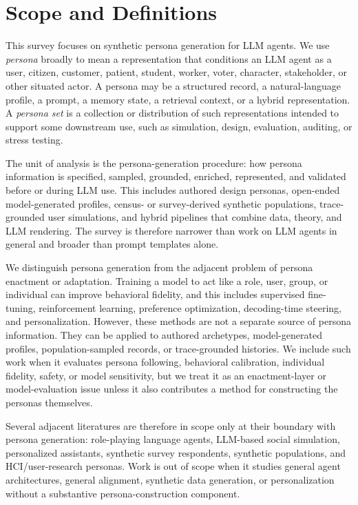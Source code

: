 \section{Scope and Definitions}
This survey focuses on synthetic persona generation for LLM agents. We use
\emph{persona} broadly to mean a representation that conditions an LLM agent as
a user, citizen, customer, patient, student, worker, voter, character,
stakeholder, or other situated actor. A persona may be a structured record, a
natural-language profile, a prompt, a memory state, a retrieval context, or a
hybrid representation. A \emph{persona set} is a collection or distribution of
such representations intended to support some downstream use, such as
simulation, design, evaluation, auditing, or stress testing.

The unit of analysis is the persona-generation procedure: how persona
information is specified, sampled, grounded, enriched, represented, and
validated before or during LLM use. This includes authored design personas,
open-ended model-generated profiles, census- or survey-derived synthetic
populations, trace-grounded user simulations, and hybrid pipelines that combine
data, theory, and LLM rendering. The survey is therefore narrower than work on
LLM agents in general and broader than prompt templates alone.

We distinguish persona generation from the adjacent problem of persona
enactment or adaptation. Training a model to act like a role, user, group, or
individual can improve behavioral fidelity, and this includes supervised
fine-tuning, reinforcement learning, preference optimization, decoding-time
steering, and personalization. However, these methods are not a separate source
of persona information. They can be applied to authored archetypes,
model-generated profiles, population-sampled records, or trace-grounded
histories. We include such work when it evaluates persona following, behavioral
calibration, individual fidelity, safety, or model sensitivity, but we treat it
as an enactment-layer or model-evaluation issue unless it also contributes a
method for constructing the personas themselves.

Several adjacent literatures are therefore in scope only at their boundary with
persona generation: role-playing language agents, LLM-based social simulation,
personalized assistants, synthetic survey respondents, synthetic populations,
and HCI/user-research personas. Work is out of scope when it studies general
agent architectures, general alignment, synthetic data generation, or
personalization without a substantive persona-construction component.
